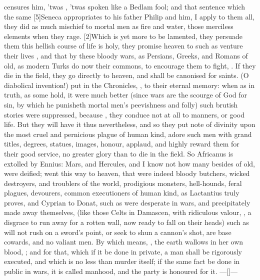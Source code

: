 {censures him, 'twas , 'twas spoken like a
Bedlam fool; and that sentence which the same [5\baselineskip]Seneca appropriates
to his father Philip and him, I apply to them all,  they
did as much mischief to mortal men as fire and water, those merciless
elements when they rage. [2\baselineskip]Which is yet more to be lamented, they
persuade them this hellish course of life is holy, they promise heaven
to such as venture their lives , and that by these bloody
wars, as Persians, Greeks, and Romans of old, as modern Turks do now
their commons, to encourage them to fight, . If
they die in the field, they go directly to heaven, and shall be
canonised for saints. (O diabolical invention!) put in the Chronicles,
, to their eternal memory: when as in truth,
as some hold, it were much better (since wars are the scourge of
God for sin, by which he punisheth mortal men's peevishness and folly)
such brutish stories were suppressed, because , they conduce not at all to manners, or good life. But
they will have it thus nevertheless, and so they put note of
divinity upon the most cruel and pernicious plague of human kind,
adore such men with grand titles, degrees, statues, images,
honour, applaud, and highly reward them for their good service, no
greater glory than to die in the field. So Africanus is extolled by
Ennius: Mars, and Hercules, and I know not how many besides of
old, were deified; went this way to heaven, that were indeed bloody
butchers, wicked destroyers, and troublers of the world, prodigious
monsters, hell-hounds, feral plagues, devourers, common executioners of
human kind, as Lactantius truly proves, and Cyprian to Donat, such as
were desperate in wars, and precipitately made away themselves, (like
those Celts in Damascen, with ridiculous valour, , a disgrace to run away for a rotten
wall, now ready to fall on their heads) such as will not rush on a
sword's point, or seek to shun a cannon's shot, are base cowards, and
no valiant men. By which means, , the earth
wallows in her own blood,
; and for that, which
if it be done in private, a man shall be rigorously executed, and
which is no less than murder itself; if the same fact be done in public
in wars, it is called manhood, and the party is honoured for it.
---[\baselineskip]---

}
